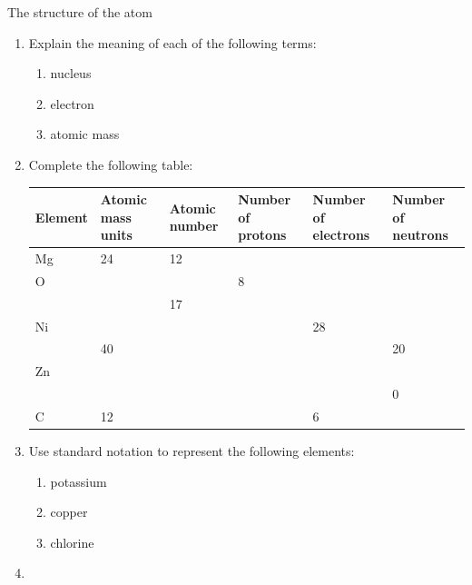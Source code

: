 \begin{exercises}{The structure of the atom}
      \label{m38745*id256225}\begin{enumerate}[noitemsep, label=\textbf{\arabic*}. ] 
            \label{m38745*uid15}\item Explain the meaning of each of the following terms:
\label{m38745*id256240}\begin{enumerate}[noitemsep, label=\textbf{\alph*}. ] 
            \label{m38745*uid16}\item nucleus
\label{m38745*uid17}\item electron
\label{m38745*uid18}\item atomic mass
\end{enumerate}
                \label{m38745*uid19}\item Complete the following table:
\begin{center} 
\begin{tabular}{|p{1.4cm}|p{1.4cm}|p{1.4cm}|p{1.4cm}|p{1.4cm}|p{1.4cm}|}\hline
\textbf{Element} & \textbf{Atomic mass units} & \textbf{Atomic number} & \textbf{Number of protons} & \textbf{Number of electrons} & \textbf{Number of neutrons}\\\hline
Mg & 24 & 12 & & & \\\hline
O & & & 8 & & \\\hline
 & & 17 & & & \\\hline
Ni & & & & 28 & \\\hline
 & 40 & & & & 20 \\\hline
Zn & & & & & \\\hline
 & & & & & 0 \\\hline
C & 12 & & & 6 & \\\hline 
\end{tabular}
\end{center}
    \par
          \label{m38745*uid20}\item Use standard notation to represent the following elements:
\label{m38745*id256772}\begin{enumerate}[noitemsep, label=\textbf{\alph*}. ] 
            \label{m38745*uid21}\item potassium
\label{m38745*uid22}\item copper
\label{m38745*uid23}\item chlorine
\end{enumerate}
                \label{m38745*uid24}\item 

\end{enumerate}
\end{exercises}
